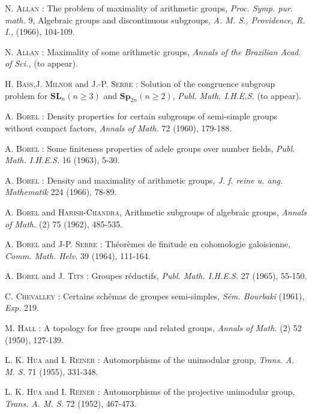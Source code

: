 \begin{thebibliography}{99}
 \textsc{N. Allan :} The problem of maximality of arithmetic groups, {\em Proc. Symp. pur. math.} 9, Algebraic groups and discontinuous subgroups, {\em A. M. S., Providence, R. I.,} (1966), 104-109.

 \textsc{N. Allan :} Maximality of some arithmetic groups, {\em Annals of the Brazilian Acad. of Sci.,} (to appear).

 \textsc{H. Bass,\pageoriginale J. Milnor} and \textsc{J.-P. Serre :} Solution of the congruence subgroup problem for $\mathbf{SL}_{n}(n\geq 3)$ and $\mathbf{Sp}_{2n}(n\geq 2)$, {\em Publ. Math. I.H.E.S.} (to appear).

 \textsc{A. Borel :} Density properties for certain subgroups of semi-simple groups without compact factors, {\em Annals of Math.} 72 (1960), 179-188.

 \textsc{A. Borel :} Some finiteness properties of adele groups over number fields, {\em Publ. Math. I.H.E.S.} 16 (1963), 5-30.

 \textsc{A. Borel :} Density and maximality of arithmetic groups, {\em J. f. reine u. ang. Mathematik} 224 (1966), 78-89.

 \textsc{A. Borel} and \textsc{Harish-Chandra}, Arithmetic subgroups of algebraic groups, {\em Annals of Math.} (2) 75 (1962), 485-535.

 \textsc{A. Borel} and \textsc{J-P. Serre :} Th\'eor\`emes de finitude en cohomologie galoisienne, {\em Comm. Math. Helv.} 39 (1964), 111-164.

 \textsc{A. Borel} and \textsc{J. Tits :} Groupes r\'eductifs, {\em Publ. Math. I.H.E.S.} 27 (1965), 55-150.

 \textsc{C. Chevalley :} Certains sch\'emas de groupes semi-simples, {\em S\'em. Bourbaki} (1961), {\em Exp.} 219.

 \textsc{M. Hall :} A topology for free groups and related groups, {\em Annals of Math.} (2) 52 (1950), 127-139.

 \textsc{L. K. Hua} and \textsc{I. Reiner :} Automorphisms of the unimodular group, {\em Trans. A. M. S.} 71 (1955), 331-348.

 \textsc{L. K. Hua} and \textsc{I. Reiner :} Automorphisms of the projective unimodular group, {\em Trans. A. M. S.} 72 (1952), 467-473.


\end{thebibliography}

